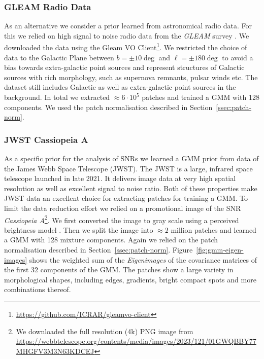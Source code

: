 \documentclass[twocolumn]{aastex631}
\newcommand{\todo}[1]{\textcolor{red}{TODO: #1}\PackageWarning{TODO:}{#1!}}
\begin{document}
    \subsubsection{GLEAM Radio Data}
    \label{sssec:gleam-radio-data}
    As an alternative we consider a prior learned from astronomical radio data. For this we relied on high signal to noise radio data from the \textit{GLEAM} survey \cite{HurleyWalker2022}. We downloaded the data using the Gleam VO Client\footnote{\url{https://github.com/ICRAR/gleamvo-client}}. We restricted the choice of data to the Galactic Plane between $b=\pm10\deg$ and $\ell = \pm180\deg$ to avoid a bias towards extra-galactic point sources and represent structures of Galactic sources with rich morphology, such as supernova remnants, pulsar winds etc. The dataset still includes Galactic as well as extra-galactic point sources in the background. In total we extracted $\approx 6 \cdot 10^5$ patches and trained a GMM with 128 components. We used the patch normalisation described in Section~\ref{ssec:patch-norm}.

    \subsubsection{JWST Cassiopeia A}
    As a specific prior for the analysis of SNRs we learned a GMM prior from data of the James Webb Space Telescope (JWST).
    The JWST is a large, infrared space telescope launched in late 2021. It delivers image data at very high spatial resolution as well as excellent signal to noise ratio. Both of these properties make JWST data an excellent choice for extracting patches for training a GMM. To limit the data reduction effort we relied on a promotional image of the SNR \textit{Cassiopeia A}\footnote{We downloaded the full resolution (4k)  PNG image from \url{https://webbtelescope.org/contents/media/images/2023/121/01GWQBBY77MHGFV3M3N63KDCEJ}}.
    We first converted the image to gray scale using a perceived brightness model \citep{scikit-image}. Then we split the image into $\approx 2$ million patches and learned a GMM with 128 mixture components. Again we relied on the patch normalisation described in Section~\ref{ssec:patch-norm}. Figure~\ref{fig:gmm-eigen-images} shows the weighted sum of the \textit{Eigenimages} of the covariance matrices of the first 32 components of the GMM. The patches show a large variety in morphological shapes, including edges, gradients, bright compact spots and more combinations thereof.

    
\end{document}
